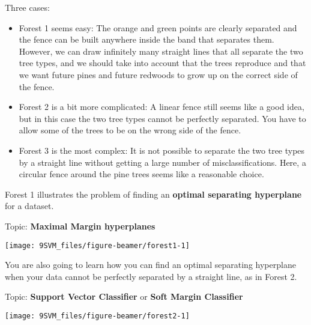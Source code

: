 \documentclass[10pt,ignorenonframetext,]{beamer}
\begin{document}
\begin{frame}

Three cases: \vspace{2mm}

\begin{itemize}
\item
  Forest 1 seems easy: The orange and green points are clearly separated
  and the fence can be built anywhere inside the band that separates
  them. However, we can draw infinitely many straight lines that all
  separate the two tree types, and we should take into account that the
  trees reproduce and that we want future pines and future redwoods to
  grow up on the correct side of the fence.
\item
  Forest 2 is a bit more complicated: A linear fence still seems like a
  good idea, but in this case the two tree types cannot be perfectly
  separated. You have to allow some of the trees to be on the wrong side
  of the fence.
\item
  Forest 3 is the most complex: It is not possible to separate the two
  tree types by a straight line without getting a large number of
  misclassifications. Here, a circular fence around the pine trees seems
  like a reasonable choice.
\end{itemize}

\end{frame}

\begin{frame}

Forest 1 illustrates the problem of finding an \textbf{optimal
separating hyperplane} for a dataset.

Topic: \textbf{Maximal Margin hyperplanes}

\begin{center}\texttt{[image: 9SVM\_files/figure-beamer/forest1-1]} \end{center}

\end{frame}

\begin{frame}

You are also going to learn how you can find an optimal separating
hyperplane when your data cannot be perfectly separated by a straight
line, as in Forest 2.

Topic: \textbf{Support Vector Classifier} or \textbf{Soft Margin
Classifier}

\begin{center}\texttt{[image: 9SVM\_files/figure-beamer/forest2-1]} \end{center}

\end{frame}
\end{document}
